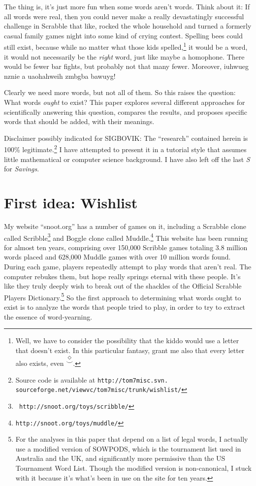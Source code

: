 \documentclass[twocolumn]{article}
\begin{document}
The thing is, it's just more fun when some words aren't words. Think
about it: If all words were real, then you could never make a really
devastatingly successful challenge in Scrabble that like, rocked the
whole household and turned a formerly casual family games night into
some kind of crying contest. Spelling bees could still exist, because
while no matter what those kids spelled,\!\footnote{Well, we have to
consider the possibility that the kiddo would use a letter that
doesn't exist. In this particular fantasy, grant me also that every
letter also exists, even $\stackrel{\Diamond}{\smile}$.} it would be
a word, it would not necessarily be the {\it right} word, just like
maybe a homophone. There would be fewer bar fights, but probably not
that many fewer. Moreover, iuhwueg nznie a uaohahweih zmbgba bawuyg!

Clearly we need more words, but not all of them. So this raises the
question: What words {\it ought} to exist? This paper explores several
different approaches for scientifically answering this question,
compares the results, and proposes specific words that should be
added, with their meanings.

Disclaimer possibly indicated for SIGBOVIK: The ``research'' contained
herein is 100\% legitimate.\!\footnote{Source code is available at
{\tt http://tom7misc.svn.
sourceforge.net/viewvc/tom7misc/trunk/wishlist/}} I have attempted to
present it in a tutorial style that assumes little mathematical or
computer science background. I have also left off the last {\it S} for
{\it Savings}.

\section{First idea: Wishlist}

My website ``{\sf snoot.org}'' has a number of games on it, including
a Scrabble clone called Scribble\footnote{{\tt
    http://snoot.org/toys/scribble/}} and Boggle clone called
Muddle.\!\footnote{{\tt http://snoot.org/toys/muddle/}} This website
has been running for almost ten years, comprising over 150,000
Scribble games totaling 3.8 million words placed and 628,000 Muddle
games with over 10 million words found. During each game, players
repeatedly attempt to play words that aren't real. The computer
rebukes them, but hope really springs eternal with these people. It's
like they truly deeply wish to break out of the shackles of the
Official Scrabble Players Dictionary.\!\footnote{For the analyses in
  this paper that depend on a list of legal words, I actually use a
  modified version of SOWPODS, which is the tournament list used in
  Australia and the UK, and significantly more permissive than the US
  Tournament Word List. Though the modified version is non-canonical,
  I stuck with it because it's what's been in use on the site for
  ten years.} So the first approach to determining what
words ought to exist is to analyze the words that people tried to
play, in order to try to extract the essence of word-yearning.
\end{document}
